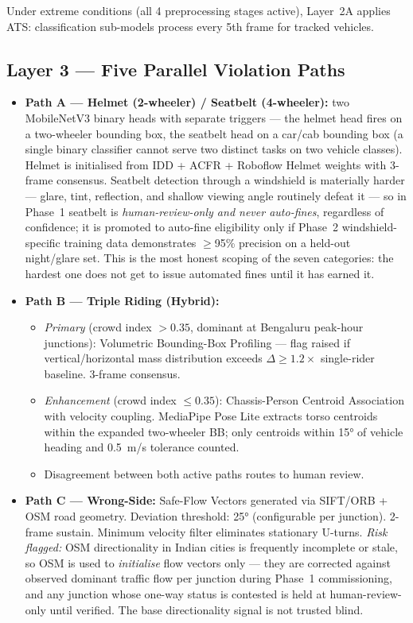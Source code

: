 \documentclass[11pt,a4paper]{article}
\begin{document}
Under extreme conditions (all 4 preprocessing stages active), Layer~2A applies ATS: classification sub-models process every 5th frame for tracked vehicles.

\subsection*{Layer 3 — Five Parallel Violation Paths}

\begin{itemize}[itemsep=0.3em]
    \item \textbf{Path A — Helmet (2-wheeler) / Seatbelt (4-wheeler):} two MobileNetV3 binary heads with separate triggers --- the helmet head fires on a two-wheeler bounding box, the seatbelt head on a car/cab bounding box (a single binary classifier cannot serve two distinct tasks on two vehicle classes). Helmet is initialised from IDD + ACFR + Roboflow Helmet weights with 3-frame consensus. Seatbelt detection through a windshield is materially harder --- glare, tint, reflection, and shallow viewing angle routinely defeat it --- so in Phase~1 seatbelt is \emph{human-review-only and never auto-fines}, regardless of confidence; it is promoted to auto-fine eligibility only if Phase~2 windshield-specific training data demonstrates $\geq$95\% precision on a held-out night/glare set. This is the most honest scoping of the seven categories: the hardest one does not get to issue automated fines until it has earned it.

    \item \textbf{Path B — Triple Riding (Hybrid):}
    \begin{itemize}
        \item \textit{Primary} (crowd index $> 0.35$, dominant at Bengaluru peak-hour junctions): Volumetric Bounding-Box Profiling — flag raised if vertical/horizontal mass distribution exceeds $\Delta \geq 1.2\times$ single-rider baseline. 3-frame consensus.
        \item \textit{Enhancement} (crowd index $\leq 0.35$): Chassis-Person Centroid Association with velocity coupling. MediaPipe Pose Lite extracts torso centroids within the expanded two-wheeler BB; only centroids within 15° of vehicle heading and 0.5~m/s tolerance counted.
        \item Disagreement between both active paths routes to human review.
    \end{itemize}

    \item \textbf{Path C — Wrong-Side:} Safe-Flow Vectors generated via SIFT/ORB + OSM road geometry. Deviation threshold: 25° (configurable per junction). 2-frame sustain. Minimum velocity filter eliminates stationary U-turns. \emph{Risk flagged:} OSM directionality in Indian cities is frequently incomplete or stale, so OSM is used to \emph{initialise} flow vectors only --- they are corrected against observed dominant traffic flow per junction during Phase~1 commissioning, and any junction whose one-way status is contested is held at human-review-only until verified. The base directionality signal is not trusted blind.


\end{itemize}
\end{document}
